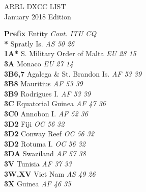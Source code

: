 ﻿\documentclass[landscape,a4paper]{article}
\begin{document}
\begin{multicols}{6}

\begin{center}
ARRL DXCC LIST \\
January 2018 Edition
\end{center}

\fontsize{8pt}{9pt}\selectfont

\noindent
\textbf{Prefix                  } Entity                             \emph{ Cont.  ITU    CQ    } \\
\textbf{*                       } Spratly Is.                        \emph{ AS     50     26    } \\
\textbf{1A*                     } S. Military Order of Malta         \emph{ EU     28     15    } \\
\textbf{3A                      } Monaco                             \emph{ EU     27     14    } \\
\textbf{3B6,7                   } Agalega \& St. Brandon Is.         \emph{ AF     53     39    } \\
\textbf{3B8                     } Mauritius                          \emph{ AF     53     39    } \\
\textbf{3B9                     } Rodrigues I.                       \emph{ AF     53     39    } \\
\textbf{3C                      } Equatorial Guinea                  \emph{ AF     47     36    } \\
\textbf{3C0                     } Annobon I.                         \emph{ AF     52     36    } \\
\textbf{3D2                     } Fiji                               \emph{ OC     56     32    } \\
\textbf{3D2                     } Conway Reef                        \emph{ OC     56     32    } \\
\textbf{3D2                     } Rotuma I.                          \emph{ OC     56     32    } \\
\textbf{3DA                     } Swaziland                          \emph{ AF     57     38    } \\
\textbf{3V                      } Tunisia                            \emph{ AF     37     33    } \\
\textbf{3W,XV                   } Viet Nam                           \emph{ AS     49     26    } \\
\textbf{3X                      } Guinea                             \emph{ AF     46     35    } \\

\end{multicols}
\end{document}
